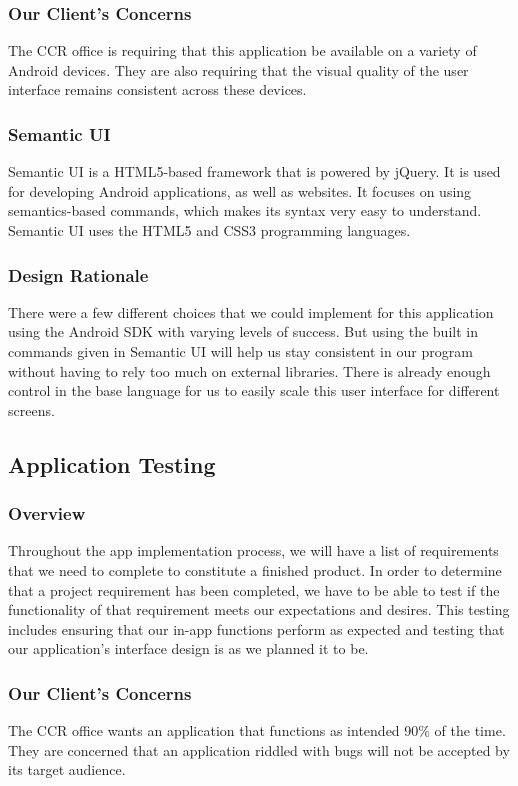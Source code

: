 \documentclass[draftclsnofoot, onecolumn, 10pt, compsoc]{IEEEtran}
\begin{document}
			\subsubsection{Our Client's Concerns}
				The CCR office is requiring that this application be available on a variety of Android devices. They are also requiring that the visual quality of the user interface remains consistent across these devices.
			\subsubsection{Semantic UI}
				Semantic UI is a HTML5-based framework that is powered by jQuery. It is used for developing Android applications, as well as websites. It focuses on using semantics-based commands, which makes its syntax very easy to understand. Semantic UI uses the HTML5 and CSS3 programming languages.
				~\cite{Semantic_UI}
				~\cite{Semantic_UI2}
			\subsubsection{Design Rationale}
				There were a few different choices that we could implement for this application using the Android SDK with varying levels of success. But using the built in commands given in Semantic UI will help us stay consistent in our program without having to rely too much on external libraries. There is already enough control in the base language for us to easily scale this user interface for different screens.

		\subsection{Application Testing}
			\subsubsection{Overview}
				Throughout the app implementation process, we will have a list of requirements that we need to complete to constitute a finished product. In order to determine that a project requirement has been completed, we have to be able to test if the functionality of that requirement meets our expectations and desires. This testing includes ensuring that our in-app functions perform as expected and testing that our application's interface design is as we planned it to be.
			\subsubsection{Our Client's Concerns}
				The CCR office wants an application that functions as intended 90\% of the time. They are concerned that an application riddled with bugs will not be accepted by its target audience.
\end{document}
